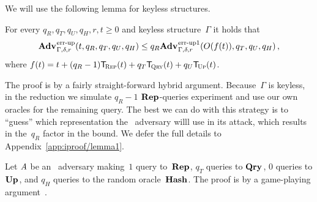 We will use the following lemma for keyless structures.
%

\begin{lemma}\label{thm:lemma1}
  For every $q_R, q_T, q_U, q_H, r, t \geq 0$ and keyless structure~$\Gamma$ it
  holds that
  \begin{equation*}
    \Adv{\errep}_{\Gamma,\delta,r}(t, q_R, q_T, q_U, q_H) \leq
    q_R\Adv{\errep1}_{\Gamma,\delta,r}(O(f(t)), q_T, q_U, q_H) \,,
  \end{equation*}
  where $f(t) = t + (q_R-1)\ticks(\Rep,t) + q_T\ticks(\Qry,t) + q_U\ticks(\Up,t)$.
\end{lemma}
%
%
\noindent
The proof is by a fairly straight-forward hybrid argument. Because~$\Gamma$ is
keyless, in the reduction we simulate $q_R-1$ $\textup{\textbf{Rep}}\hspace{0.5pt}$-queries experiment and use
our own oracles for the remaining query. The best we can do with this strategy
is to ``guess'' which representation the \errep\ adversary willl use in its
attack, which results in the~$q_R$ factor in the bound.
%
We defer the full details to Appendix~\ref{app:iproof/lemma1}.

Let $\mathit{A}$ be an \errep\ adversary making~$1$ query to~$\textup{\textbf{Rep}}\hspace{0.5pt}$, $q_T$ queries
to $\textup{\textbf{Qry}}\hspace{0.5pt}$, $0$ queries to $\textup{\textbf{Up}}\hspace{0.5pt}$, and $q_H$ queries to the random
oracle~$\textup{\textbf{Hash}}\hspace{0.5pt}$.
%
The proof is by a game-playing argument~\cite{bellare2006triple}.
